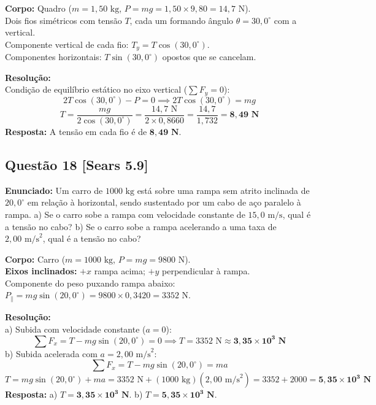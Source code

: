 \documentclass[11pt,a4paper]{article}
\begin{document}
\begin{dclbox}
\textbf{Corpo:} Quadro ($m = 1,50\text{ kg}$, $P = mg = 1,50 \times 9,80 = 14,7\text{ N}$).\\
Dois fios simétricos com tensão $T$, cada um formando ângulo $\theta = 30,0^\circ$ com a vertical.\\
Componente vertical de cada fio: $T_y = T \cos(30,0^\circ)$.\\
Componentes horizontais: $T \sin(30,0^\circ)$ opostos que se cancelam.
\end{dclbox}

\noindent
\textbf{Resolução:}\\
Condição de equilíbrio estático no eixo vertical ($\sum F_y = 0$):
\[ 2 T \cos(30,0^\circ) - P = 0 \implies 2 T \cos(30,0^\circ) = mg \]
\[ T = \frac{mg}{2 \cos(30,0^\circ)} = \frac{14,7\text{ N}}{2 \times 0,8660} = \frac{14,7}{1,732} = \mathbf{8,49\text{ N}} \]
\textbf{Resposta:} A tensão em cada fio é de $\mathbf{8,49\text{ N}}$.

\vspace{0.3cm}
\subsection*{Questão 18 [Sears 5.9]}
\textbf{Enunciado:} Um carro de $1000\text{ kg}$ está sobre uma rampa sem atrito inclinada de $20,0^\circ$ em relação à horizontal, sendo sustentado por um cabo de aço paralelo à rampa. a) Se o carro sobe a rampa com velocidade constante de $15,0\text{ m/s}$, qual é a tensão no cabo? b) Se o carro sobe a rampa acelerando a uma taxa de $2,00\text{ m/s}^2$, qual é a tensão no cabo?

\begin{dclbox}
\textbf{Corpo:} Carro ($m = 1000\text{ kg}$, $P = mg = 9800\text{ N}$).\\
\textbf{Eixos inclinados:} $+x$ rampa acima; $+y$ perpendicular à rampa.\\
Componente do peso puxando rampa abaixo: $P_\parallel = mg\sin(20,0^\circ) = 9800 \times 0,3420 = 3352\text{ N}$.
\end{dclbox}

\noindent
\textbf{Resolução:}\\
a) Subida com velocidade constante ($a = 0$):
\[ \sum F_x = T - mg\sin(20,0^\circ) = 0 \implies T = 3352\text{ N} \approx \mathbf{3,35 \times 10^3\text{ N}} \]
b) Subida acelerada com $a = 2,00\text{ m/s}^2$:
\[ \sum F_x = T - mg\sin(20,0^\circ) = m a \]
\[ T = mg\sin(20,0^\circ) + m a = 3352\text{ N} + (1000\text{ kg})(2,00\text{ m/s}^2) = 3352 + 2000 = \mathbf{5,35 \times 10^3\text{ N}} \]
\textbf{Resposta:} a) $T = \mathbf{3,35 \times 10^3\text{ N}}$. b) $T = \mathbf{5,35 \times 10^3\text{ N}}$.
\end{document}
